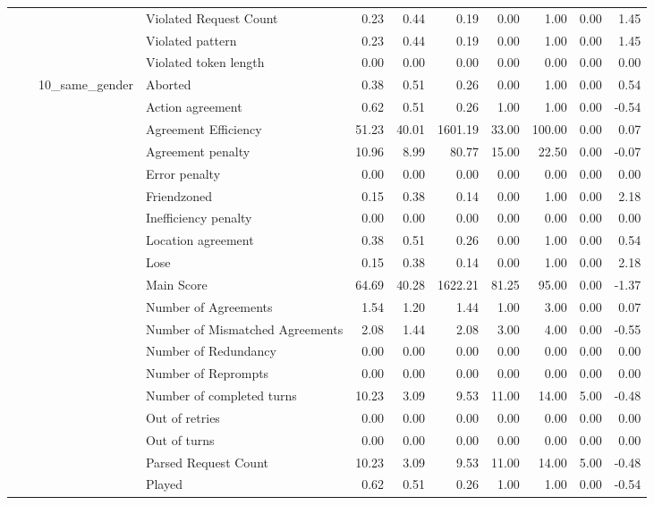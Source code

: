 \begin{tabular}{llllrrrrrrr}
 &  &  & Violated Request Count & 0.23 & 0.44 & 0.19 & 0.00 & 1.00 & 0.00 & 1.45 \\
 &  &  & Violated pattern & 0.23 & 0.44 & 0.19 & 0.00 & 1.00 & 0.00 & 1.45 \\
 &  &  & Violated token length & 0.00 & 0.00 & 0.00 & 0.00 & 0.00 & 0.00 & 0.00 \\
\cline{3-11}
 &  & \multirow[t]{27}{*}{10_same_gender} & Aborted & 0.38 & 0.51 & 0.26 & 0.00 & 1.00 & 0.00 & 0.54 \\
 &  &  & Action agreement & 0.62 & 0.51 & 0.26 & 1.00 & 1.00 & 0.00 & -0.54 \\
 &  &  & Agreement Efficiency & 51.23 & 40.01 & 1601.19 & 33.00 & 100.00 & 0.00 & 0.07 \\
 &  &  & Agreement penalty & 10.96 & 8.99 & 80.77 & 15.00 & 22.50 & 0.00 & -0.07 \\
 &  &  & Error penalty & 0.00 & 0.00 & 0.00 & 0.00 & 0.00 & 0.00 & 0.00 \\
 &  &  & Friendzoned & 0.15 & 0.38 & 0.14 & 0.00 & 1.00 & 0.00 & 2.18 \\
 &  &  & Inefficiency penalty & 0.00 & 0.00 & 0.00 & 0.00 & 0.00 & 0.00 & 0.00 \\
 &  &  & Location agreement & 0.38 & 0.51 & 0.26 & 0.00 & 1.00 & 0.00 & 0.54 \\
 &  &  & Lose & 0.15 & 0.38 & 0.14 & 0.00 & 1.00 & 0.00 & 2.18 \\
 &  &  & Main Score & 64.69 & 40.28 & 1622.21 & 81.25 & 95.00 & 0.00 & -1.37 \\
 &  &  & Number of Agreements & 1.54 & 1.20 & 1.44 & 1.00 & 3.00 & 0.00 & 0.07 \\
 &  &  & Number of Mismatched Agreements & 2.08 & 1.44 & 2.08 & 3.00 & 4.00 & 0.00 & -0.55 \\
 &  &  & Number of Redundancy & 0.00 & 0.00 & 0.00 & 0.00 & 0.00 & 0.00 & 0.00 \\
 &  &  & Number of Reprompts & 0.00 & 0.00 & 0.00 & 0.00 & 0.00 & 0.00 & 0.00 \\
 &  &  & Number of completed turns & 10.23 & 3.09 & 9.53 & 11.00 & 14.00 & 5.00 & -0.48 \\
 &  &  & Out of retries & 0.00 & 0.00 & 0.00 & 0.00 & 0.00 & 0.00 & 0.00 \\
 &  &  & Out of turns & 0.00 & 0.00 & 0.00 & 0.00 & 0.00 & 0.00 & 0.00 \\
 &  &  & Parsed Request Count & 10.23 & 3.09 & 9.53 & 11.00 & 14.00 & 5.00 & -0.48 \\
 &  &  & Played & 0.62 & 0.51 & 0.26 & 1.00 & 1.00 & 0.00 & -0.54 \\

\end{tabular}
